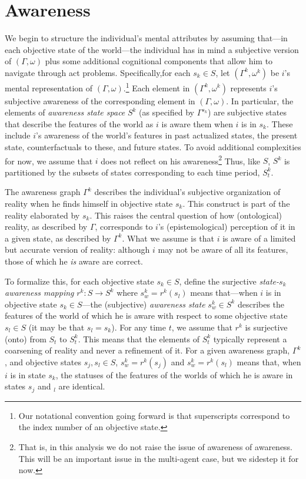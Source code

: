 \documentclass[
11pt,
titlepage,
reqno,
]{article}%
\theoremstyle{definition}
\begin{document}
	
\section{Awareness}
We begin to structure the individual's mental attributes by assuming that---in each objective state of the world---the individual has in mind a subjective version of $(\Gamma,\omega)$ plus some additional cognitional components that allow him to navigate through act problems. 
Specifically,for each $s_k\in S$,  let $(\Gamma^{k},\omega^{k})$ be $i$'s mental representation of $(\Gamma,\omega)$.\footnote
{
	Our notational convention going forward is that superscripts correspond to the index number of an objective state. 
}
Each element in $(\Gamma^{k},\omega^{k})$ represents $i$'s subjective awareness of the corresponding element in $(\Gamma,\omega)$.
In particular, the elements of \textit{awareness state space} $S^k$ (as specified by $\Gamma^{s_k}$) are subjective states that describe the features of the world as $i$ is aware them when $i$ is in $s_k$.
These include $i$'s awareness of the world's features in past actualized states, the present state, counterfactuals to these, and future states.
To avoid additional complexities for now, we assume that $i$ does not reflect on his awareness\footnote
{ 
	That is, in this analysis we do not raise the issue of awareness of awareness. 
	This will be an important issue in the multi-agent case, but we sidestep it for now.
}
Thus, like $S$, $S^k$ is partitioned by the subsets of states corresponding to each time period, $S^k_t$.

The awareness graph $\Gamma^k$ describes the individual's subjective organization of reality when he finds himself in objective state $s_k$. 
This construct is part of the reality elaborated by  $s_k$.
This raises the central question of how (ontological) reality, as described by $\Gamma$, corresponds to $i$'s (epistemological) perception of it in a given state, as described by $\Gamma^k$.
What we assume is that $i$ is aware of a limited but accurate version of reality: although $i$ may not be aware of all its features,  those of which he \textit{is} aware are correct. 

To formalize this, for each objective state $s_k\in S$, define the surjective \textit{state-$s_k$ awareness mapping} $r^k:S\rightarrow S^k$ where $s^{k}_w=r^k(s_l)$ means that---when $i$ is in objective state $s_k\in S$---the (subjective) \textit{awareness state} $s^{k}_w\in S^k$ describes the features  of the world of which he is aware with respect to some objective state $s_l\in S$ (it may be that  $s_l=s_k$).
For any time $t$, we assume that $r^k$ is surjective (onto) from $S_t$ to $S^k_t$.
This means that the elements of $S^k_t$ typically represent a coarsening of reality and never a refinement of it. 
For a given awareness graph, $\Gamma^k$, and objective states $s_j,s_l\in S$, $s^{k}_w=r^{k}(s_j)$ and $s^{k}_w=r^k(s_l)$ means that, when $i$ is in state $s_k$, the statuses of the features of the worlds of which he is aware in states $s_j$ and $_l$ are identical.
\end{document}
